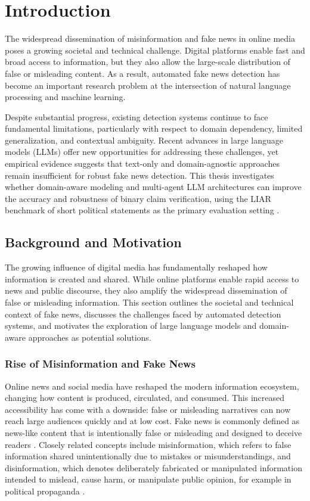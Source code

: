 \chapter{Introduction}

The widespread dissemination of misinformation and fake news in online media poses a growing societal and technical challenge. Digital platforms enable fast and broad access to information, but they also allow the large-scale distribution of false or misleading content. As a result, automated fake news detection has become an important research problem at the intersection of natural language processing and machine learning.

Despite substantial progress, existing detection systems continue to face fundamental limitations, particularly with respect to domain dependency, limited generalization, and contextual ambiguity. Recent advances in large language models (LLMs) offer new opportunities for addressing these challenges, yet empirical evidence suggests that text-only and domain-agnostic approaches remain insufficient for robust fake news detection. This thesis investigates whether domain-aware modeling and multi-agent LLM architectures can improve the accuracy and robustness of binary claim verification, using the LIAR benchmark of short political statements as the primary evaluation setting \cite{wang2017liarliarpantsfire}.

\section{Background and Motivation}

The growing influence of digital media has fundamentally reshaped how information is created and shared. While online platforms enable rapid access to news and public discourse, they also amplify the widespread dissemination of false or misleading information. This section outlines the societal and technical context of fake news, discusses the challenges faced by automated detection systems, and motivates the exploration of large language models and domain-aware approaches as potential solutions.

\subsection{Rise of Misinformation and Fake News}
Online news and social media have reshaped the modern information ecosystem, changing how content is produced, circulated, and consumed. This increased accessibility has come with a downside: false or misleading narratives can now reach large audiences quickly and at low cost. Fake news is commonly defined as news-like content that is intentionally false or misleading and designed to deceive readers \cite{fi16080298}. Closely related concepts include misinformation, which refers to false information shared unintentionally due to mistakes or misunderstandings, and disinformation, which denotes deliberately fabricated or manipulated information intended to mislead, cause harm, or manipulate public opinion, for example in political propaganda \cite{10704605}.

